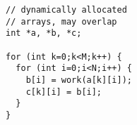 \begin{lstlisting}[morekeywords={g_qCount},belowskip=0pt]
// dynamically allocated
// arrays, may overlap
int *a, *b, *c;

for (int k=0;k<M;k++) {
  for (int i=0;i<N;i++) {
    b[i] = work(a[k][i]);
    c[k][i] = b[i];
  }
}
\end{lstlisting}
